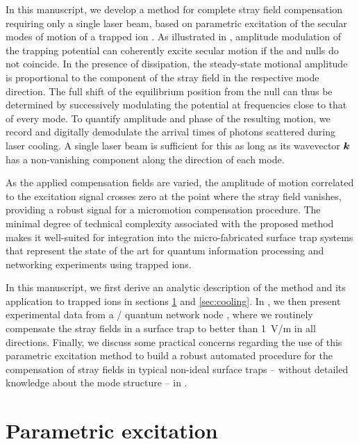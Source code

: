 \documentclass[pra,twocolumn]{revtex4-2}
\begin{document}
In this manuscript, we develop a method for complete stray field compensation requiring only a single laser beam, based on parametric excitation of the secular modes of motion of a trapped ion \cite{zhaoParametricExcitationsTrapped2002,ibarakiDetectionParametricResonance2011,narayananElectricFieldCompensation2011,tanakaMicromotionCompensationSurface2012,amiram.eltonySensitive3DMicromotion2013}.
As illustrated in , amplitude modulation of the \RF{} trapping potential can coherently excite secular motion if the \DC{} and \RF{} nulls do not coincide.
In the presence of dissipation, the steady-state motional amplitude is proportional to the component of the stray field in the respective mode direction.
The full shift of the equilibrium position from the \RF{} null can thus be determined by successively modulating the potential at frequencies close to that of every mode.
To quantify amplitude and phase of the resulting motion, we record and digitally demodulate the arrival times of photons scattered during laser cooling.
A single laser beam is sufficient for this as long as its wavevector $\boldsymbol{k}$ has a non-vanishing component along the direction of each mode.

As the applied compensation fields are varied, the amplitude of motion correlated to the excitation signal crosses zero at the point where the stray field vanishes, providing a robust signal for a micromotion compensation procedure.
The minimal degree of technical complexity associated with the proposed method makes it well-suited for integration into the micro-fabricated surface trap systems that represent the state of the art for quantum information processing and networking experiments using trapped ions.

In this manuscript, we first derive an analytic description of the method and its application to trapped ions in sections \ref{sec:theory} and \ref{sec:cooling}.
In , we then present experimental data from a \srplus{}/\caplus{} quantum network node \cite{stephensonHighrateHighfidelityEntanglement2020}, where we routinely compensate the stray fields in a surface trap to better than \SI{1}{\volt/\metre} in all directions.
Finally, we discuss some practical concerns regarding the use of this parametric excitation method to build a robust automated procedure for the compensation of stray fields in typical non-ideal surface traps – without detailed knowledge about the mode structure – in .


\section{Parametric excitation}
\label{sec:theory}
\end{document}

